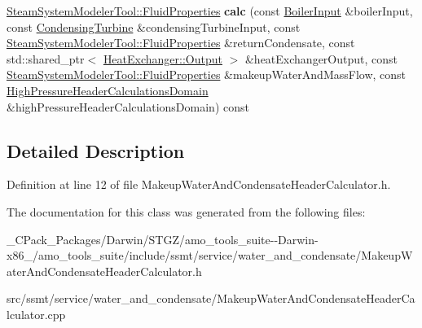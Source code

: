 \begin{DoxyCompactItemize}
\item 
\mbox{\label{class_makeup_water_and_condensate_header_calculator_a38c092c32d7588c4e6782cd778553c40}} 
\hyperlink{struct_steam_system_modeler_tool_1_1_fluid_properties}{Steam\+System\+Modeler\+Tool\+::\+Fluid\+Properties} {\bfseries calc} (const \hyperlink{class_boiler_input}{Boiler\+Input} \&boiler\+Input, const \hyperlink{class_condensing_turbine}{Condensing\+Turbine} \&condensing\+Turbine\+Input, const \hyperlink{struct_steam_system_modeler_tool_1_1_fluid_properties}{Steam\+System\+Modeler\+Tool\+::\+Fluid\+Properties} \&return\+Condensate, const std\+::shared\+\_\+ptr$<$ \hyperlink{struct_heat_exchanger_1_1_output}{Heat\+Exchanger\+::\+Output} $>$ \&heat\+Exchanger\+Output, const \hyperlink{struct_steam_system_modeler_tool_1_1_fluid_properties}{Steam\+System\+Modeler\+Tool\+::\+Fluid\+Properties} \&makeup\+Water\+And\+Mass\+Flow, const \hyperlink{class_high_pressure_header_calculations_domain}{High\+Pressure\+Header\+Calculations\+Domain} \&high\+Pressure\+Header\+Calculations\+Domain) const
\end{DoxyCompactItemize}


\subsection{Detailed Description}


Definition at line 12 of file Makeup\+Water\+And\+Condensate\+Header\+Calculator.\+h.



The documentation for this class was generated from the following files\+:\begin{DoxyCompactItemize}
\item 
\+\_\+\+C\+Pack\+\_\+\+Packages/\+Darwin/\+S\+T\+G\+Z/amo\+\_\+tools\+\_\+suite-\/-\/\+Darwin-\/x86\+\_/amo\+\_\+tools\+\_\+suite/include/ssmt/service/water\+\_\+and\+\_\+condensate/Makeup\+Water\+And\+Condensate\+Header\+Calculator.\+h\item 
src/ssmt/service/water\+\_\+and\+\_\+condensate/Makeup\+Water\+And\+Condensate\+Header\+Calculator.\+cpp\end{DoxyCompactItemize}
